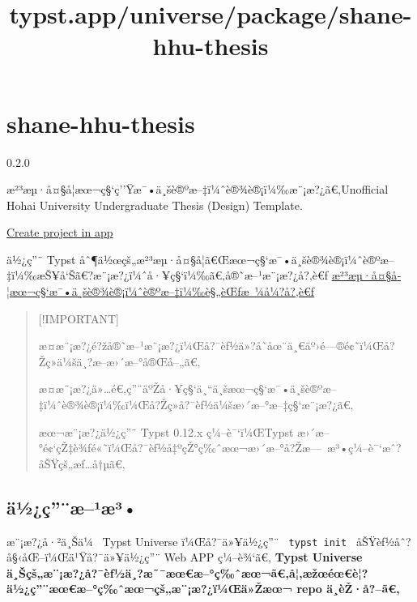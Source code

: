 \title{typst.app/universe/package/shane-hhu-thesis}

\label{banner}
\label{template-thumbnail}

\section{shane-hhu-thesis}\label{shane-hhu-thesis}

{ 0.2.0 }

æ²³æµ·å¤§å­¦æœ¬ç§`ç''Ÿæ¯•ä¸šè®ºæ--‡ï¼ˆè®¾è®¡ï¼‰æ¨¡æ?¿ã€‚Unofficial Hohai
University Undergraduate Thesis (Design) Template.

\href{/app?template=shane-hhu-thesis&version=0.2.0}{Create project in
app}

\label{readme}
ä½¿ç''¨ Typst
åˆ¶ä½œçš„æ²³æµ·å¤§å­¦ã€Œæœ¬ç§`æ¯•ä¸šè®¾è®¡ï¼ˆè®ºæ--‡ï¼‰æŠ¥å`Šã€?æ¨¡æ?¿ï¼ˆå·¥ç§`ï¼‰ã€‚å®˜æ--¹æ¨¡æ?¿å?‚è€ƒ
\href{https://bylw.hhu.edu.cn/UpLoadFile/83cd5f1169974a0db06d865c7ee11af4.pdf}{æ²³æµ·å¤§å­¦æœ¬ç§`æ¯•ä¸šè®¾è®¡ï¼ˆè®ºæ--‡ï¼‰è§„èŒƒæ~¼å¼?å?‚è€ƒ}

\begin{quote}
{[}!IMPORTANT{]}

æ­¤æ¨¡æ?¿é?žå®˜æ--¹æ¨¡æ?¿ï¼Œå?¯èƒ½ä»?å­˜åœ¨ä¸€äº›é---®é¢˜ï¼Œå?Žç»­ä¼šä¸?æ--­æ›´æ--°å®Œå--„ã€‚

æ­¤æ¨¡æ?¿ä»\ldots é€‚ç''¨äºŽå·¥ç§`ä¸``ä¸šæœ¬ç§`æ¯•ä¸šè®ºæ--‡ï¼ˆè®¾è®¡ï¼‰ï¼Œå?Žç»­å?¯èƒ½ä¼šæ›´æ--°æ--‡ç§`æ¨¡æ?¿ã€‚

æœ¬æ¨¡æ?¿ä½¿ç''¨ Typst 0.12.x ç¼--è¯`ï¼ŒTypst
æ›´æ--°é¢`çŽ‡è¾ƒé«˜ï¼Œå?¯èƒ½å‡ºçŽ°ç‰ˆæœ¬æ›´æ--°å?Žæ---~æ³•ç¼--è¯`æˆ?åŠŸçš„æƒ\ldots å†µã€‚
\end{quote}


\subsection{ä½¿ç''¨æ--¹æ³•}\label{uxe4uxbduxe7uxe6uxb9uxe6uxb3}

æ¨¡æ?¿å·²ä¸Šä¼~ Typst Universe ï¼Œå?¯ä»¥ä½¿ç''¨ \texttt{\ typst\ init\ }
åŠŸèƒ½åˆ?å§‹åŒ--ï¼Œä¹Ÿå?¯ä»¥ä½¿ç''¨ Web APP ç¼--è¾`ã€‚ \textbf{Typst
Universe
ä¸Šçš„æ¨¡æ?¿å?¯èƒ½ä¸?æ˜¯æœ€æ--°ç‰ˆæœ¬ã€‚å¦‚æžœéœ€è¦?ä½¿ç''¨æœ€æ--°ç‰ˆæœ¬çš„æ¨¡æ?¿ï¼Œä»Žæœ¬
repo ä¸­èŽ·å?--ã€‚}


